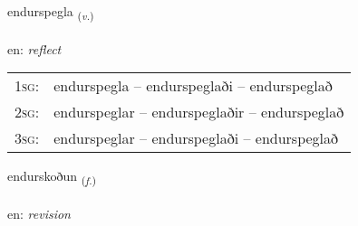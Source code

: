 \documentclass[frontgrid, backgrid]{flacards}\usepackage[]{graphicx}\usepackage[]{color}
\begin{document}
\renewcommand{\blhead}{\vskip5pt {\small\bfseries\footnotesize Sagnorð | Verb }}
\renewcommand{\bcfoot}{\vskip5pt \hspace{2pt}{\small\bfseries\footnotesize 2K}}


{endurspegla \small{\textsubscript{(\textit{v.})}} \\[1ex] %
 \\
en: \emph{reflect} \\  [2ex]
\renewcommand*{\arraystretch}{0.8}
\begin{tabular}{p{1cm}l}
\textsc{1sg}: & endurspegla -- endurspeglaði -- endurspeglað \\ 
\textsc{2sg}: & endurspeglar -- endurspeglaðir -- endurspeglað \\ 
\textsc{3sg}: & endurspeglar -- endurspeglaði -- endurspeglað \\ 
\end{tabular}
}

\renewcommand{\flhead}{\vskip5pt \fboxsep=0pt {\small\bfseries\footnotesize Nafnorð | Noun}}
\renewcommand{\fcfoot}{\vskip5pt \fboxsep=0pt \hspace{2pt}{\small\bfseries\footnotesize 2K}}

\renewcommand{\blhead}{\vskip5pt {\small\bfseries\footnotesize Nafnorð | Noun }}
\renewcommand{\bcfoot}{\vskip5pt \hspace{2pt}{\small\bfseries\footnotesize 2K}}


{endurskoðun \small{\textsubscript{(\textit{f.})}} \\[1ex] %
 \\
en: \emph{revision} \\  [2ex]
\renewcommand*{\arraystretch}{0.8}
}
\end{document}
